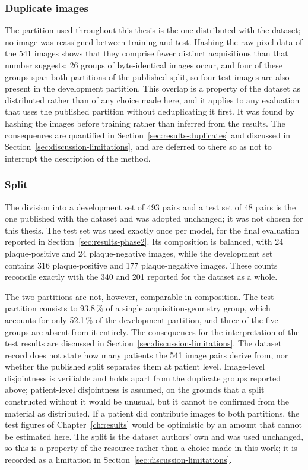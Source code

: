 \subsubsection*{Duplicate images}
\label{subsec:duplicates}
The partition used throughout this thesis is the one distributed with the dataset; no image was
reassigned between training and test. Hashing the raw pixel data of the 541 images shows that
they comprise fewer distinct acquisitions than that number suggests: 26 groups of byte-identical
images occur, and four of these groups span both partitions of the published split, so four test
images are also present in the development partition. This overlap is a property of the dataset
as distributed rather than of any choice made here, and it applies to any evaluation that uses
the published partition without deduplicating it first. It was found by hashing the images before
training rather than inferred from the results. The consequences are quantified in
Section~\ref{sec:results-duplicates} and discussed in Section~\ref{sec:discussion-limitations},
and are deferred to there so as not to interrupt the description of the method.

\subsubsection*{Split}
The division into a development set of 493 pairs and a test set of 48 pairs is the one published
with the dataset and was adopted unchanged; it was not chosen for this thesis. The test set was
used exactly once per model, for the final evaluation reported in
Section~\ref{sec:results-phase2}. Its composition is balanced, with 24 plaque-positive and 24
plaque-negative images, while the development set contains 316 plaque-positive and 177
plaque-negative images. These counts reconcile exactly with the 340 and 201 reported for the
dataset as a whole.

The two partitions are not, however, comparable in composition. The test partition consists to
93.8\,\% of a single acquisition-geometry group, which accounts for only 52.1\,\% of the
development partition, and three of the five groups are absent from it entirely. The consequences
for the interpretation of the test results are discussed in
Section~\ref{sec:discussion-limitations}.
The dataset record does not state how many patients the 541 image pairs derive from, nor whether
the published split separates them at patient level. Image-level disjointness is verifiable and
holds apart from the duplicate groups reported above; patient-level disjointness is assumed, on
the grounds that a split constructed without it would be unusual, but it cannot be confirmed from
the material as distributed. If a patient did contribute images to both partitions, the test
figures of Chapter~\ref{ch:results} would be optimistic by an amount that cannot be estimated
here. The split is the dataset authors' own and was used unchanged, so this is a property of the
resource rather than a choice made in this work; it is recorded as a limitation in
Section~\ref{sec:discussion-limitations}.

